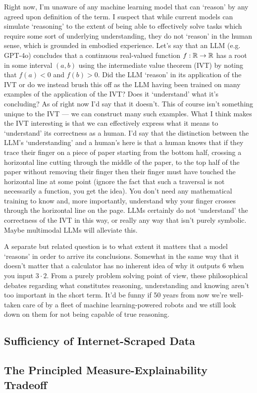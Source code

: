 \documentclass[11pt]{article}
\begin{document}
\begin{appendices}
Right now, I'm unaware of any machine learning model that can `reason' by any agreed upon definition of the term. I suspect that while current models can simulate `reasoning' to the extent of being able to effectively solve tasks which require some sort of underlying understanding, they do not `reason' in the human sense, which is grounded in embodied experience. Let's say that an LLM (e.g. GPT-4o) concludes that a continuous real-valued function $f:\mathbb{R}\rightarrow\mathbb{R}$ has a root in some interval $(a, b)$ using the intermediate value theorem (IVT) by noting that $f(a)<0$ and $f(b)>0$. Did the LLM `reason' in its application of the IVT or do we instead brush this off as the LLM having been trained on many examples of the application of the IVT? Does it `understand' what it's concluding? As of right now I'd say that it doesn't. This of course isn't something unique to the IVT — we can construct many such examples. What I think makes the IVT interesting is that we can effectively express what it means to `understand' its correctness as a human. I'd say that the distinction between the LLM's `understanding' and a human's here is that a human knows that if they trace their finger on a piece of paper starting from the bottom half, crossing a horizontal line cutting through the middle of the paper, to the top half of the paper without removing their finger then their finger must have touched the horizontal line at some point (ignore the fact that such a traversal is not necessarily a function, you get the idea). You don't need any mathematical training to know and, more importantly, understand why your finger crosses through the horizontal line on the page. LLMs certainly do not `understand' the correctness of the IVT in this way, or really any way that isn't purely symbolic. Maybe multimodal LLMs will alleviate this.

A separate but related question is to what extent it matters that a model `reasons' in order to arrive its conclusions. Somewhat in the same way that it doesn't matter that a calculator has no inherent idea of why it outputs 6 when you input $3\cdot2$. From a purely problem solving point of view, these philosophical debates regarding what constitutes reasoning, understanding and knowing aren't too important in the short term. It'd be funny if 50 years from now we're well-taken care of by a fleet of machine learning-powered robots and we still look down on them for not being capable of true reasoning.

\subsection{Sufficiency of Internet-Scraped Data}
\TODO{}

\subsection{The Principled Measure-Explainability Tradeoff}
\TODO{}

\end{appendices}
\end{document}
